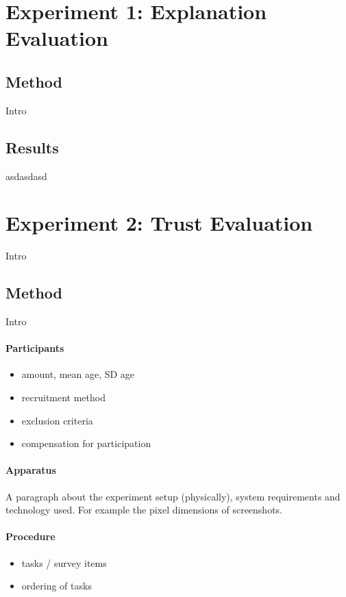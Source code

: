 \section{Experiment 1: Explanation Evaluation}

\subsection{Method}
Intro

\subsection{Results}
asdasdasd









\section{Experiment 2: Trust Evaluation}
Intro


\subsection{Method}
Intro

\paragraph{Participants}
\begin{itemize}
	\item amount, mean age, SD age
	\item recruitment method
	\item exclusion criteria 
	\item compensation for participation
\end{itemize}

\paragraph{Apparatus}
A paragraph about the experiment setup (physically), system requirements and technology used. For example the pixel dimensions of screenshots. \newline

\paragraph{Procedure}
\begin{itemize}
	\item tasks / survey items
	\item ordering of tasks
\end{itemize}

